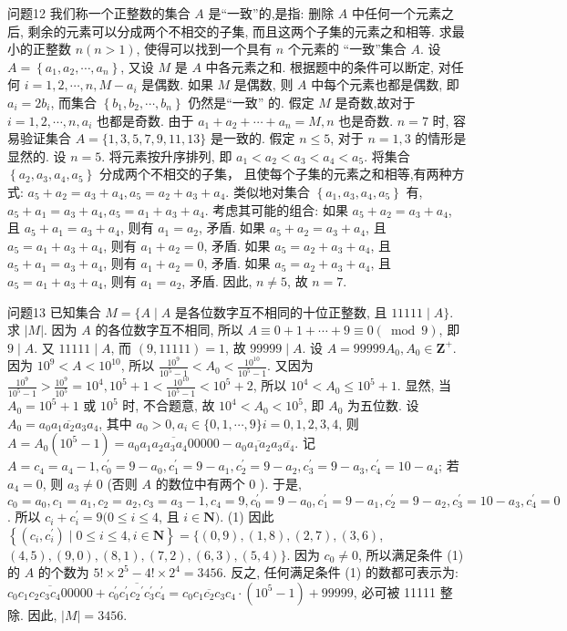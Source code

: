 问题12 我们称一个正整数的集合 $A$ 是“一致”的,是指: 删除 $A$ 中任何一个元素之后, 剩余的元素可以分成两个不相交的子集, 而且这两个子集的元素之和相等.
求最小的正整数 $n(n>1)$, 使得可以找到一个具有 $n$ 个元素的 “一致”集合 $A$.
设 $A=\left\{a_1, a_2, \cdots, a_n\right\}$, 又设 $M$ 是 $A$ 中各元素之和.
根据题中的条件可以断定, 对任何 $i=1,2, \cdots, n, M-a_i$ 是偶数.
如果 $M$ 是偶数, 则 $A$ 中每个元素也都是偶数, 即 $a_i=2 b_i$, 而集合 $\left\{b_1, b_2, \cdots, b_n\right\}$ 仍然是“一致” 的.
假定 $M$ 是奇数,故对于 $i=1,2, \cdots, n, a_i$ 也都是奇数.
由于 $a_1+a_2+\cdots+ a_n=M, n$ 也是奇数.
$n=7$ 时, 容易验证集合 $A=\{1,3,5,7,9,11,13\}$ 是一致的.
假定 $n \leqslant 5$, 对于 $n=1,3$ 的情形是显然的.
设 $n=5$. 将元素按升序排列, 即 $a_1<a_2<a_3<a_4<a_5$. 将集合 $\left\{a_2, a_3, a_4, a_5\right\}$ 分成两个不相交的子集， 且使每个子集的元素之和相等,有两种方式: $a_5+a_2=a_3+a_4, a_5=a_2+a_3+ a_4$. 类似地对集合 $\left\{a_1, a_3, a_4, a_5\right\}$ 有, $a_5+a_1=a_3+a_4, a_5=a_1+a_3+a_4$. 考虑其可能的组合: 如果 $a_5+a_2=a_3+a_4$, 且 $a_5+a_1=a_3+a_4$, 则有 $a_1= a_2$, 矛盾.
如果 $a_5+a_2=a_3+a_4$, 且 $a_5=a_1+a_3+a_4$, 则有 $a_1+a_2=0$, 矛盾.
如果 $a_5=a_2+a_3+a_4$, 且 $a_5+a_1=a_3+a_4$, 则有 $a_1+a_2=0$, 矛盾.
如果 $a_5=a_2+a_3+a_4$, 且 $a_5=a_1+a_3+a_4$, 则有 $a_1=a_2$, 矛盾.
因此, $n \neq 5$, 故 $n=7$.



问题13 已知集合 $M=\{A \mid A$ 是各位数字互不相同的十位正整数, 且 $11111 \mid A\}$. 求 $|M|$.
因为 $A$ 的各位数字互不相同, 所以 $A \equiv 0+1+\cdots+9 \equiv 0(\bmod 9)$, 即 $9 \mid A$. 又 $11111 \mid A$, 而 $(9,11111)=1$, 故 $99999 \mid A$. 设 $A=99999 A_0, A_0 \in \mathbf{Z}^{+}$. 因为 $10^9<A<10^{10}$, 所以 $\frac{10^9}{10^5-1}<A_0<\frac{10^{10}}{10^5-1}$. 又因为 $\frac{10^9}{10^5-1}> \frac{10^9}{10^5}=10^4, 10^5+1<\frac{10^{10}}{10^5-1}<10^5+2$, 所以 $10^4<A_0 \leqslant 10^5+1$.
显然, 当 $A_0=10^5+1$ 或 $10^5$ 时, 不合题意, 故 $10^4<A_0<10^5$, 即 $A_0$ 为五位数.
设 $A_0=\overline{a_0 a_1 a_2 a_3 a_4}$, 其中 $a_0>0, a_i \in\{0,1, \cdots, 9\} i=0,1,2,3,4$, 则 $A=A_0\left(10^5-1\right)=\overline{a_0 a_1 a_2 a_3 a_4 00000}-\overline{a_0 a_1 a_2 a_3} \overline{a_4}$. 记 $A= c_4=a_4-1, c_0^{\prime}=9-a_0, c_1^{\prime}=9-a_1, c_2^{\prime}=9-a_2, c_3^{\prime}=9-a_3, c_4^{\prime}=10- a_4$; 若 $a_4=0$, 则 $a_3 \neq 0$ (否则 $A$ 的数位中有两个 0 ). 于是, $c_0=a_0, c_1=a_1, c_2=a_2, c_3=a_3-1, c_4=9, c_0^{\prime}=9-a_0, c_1^{\prime}=9-a_1, c_2^{\prime}=9-a_2, c_3^{\prime}= 10-a_3, c_4^{\prime}=0$. 所以 $c_i+c_i^{\prime}=9(0 \leqslant i \leqslant 4$, 且 $i \in \mathbf{N})$. (1)
因此 $\left\{\left(c_i, c_i^{\prime}\right) \mid 0 \leqslant i \leqslant 4, i \in \mathbf{N}\right\}=\{(0,9),(1,8),(2,7),(3,6)$, $(4,5),(9,0),(8,1),(7,2),(6,3),(5,4)\}$. 因为 $c_0 \neq 0$, 所以满足条件 (1) 的 $A$ 的个数为 $5 ! \times 2^5-4 ! \times 2^4=3456$. 反之, 任何满足条件 (1) 的数都可表示为: $\overline{c_0 c_1 c_2 c_3 c_4 00000}+\overline{c_0^{\prime} c_1^{\prime} c_2{ }^{\prime} c_3^{\prime} c_4^{\prime}}=\overline{c_0 c_1 c_2 c_3 c_4} \cdot\left(10^5-1\right)+99999$, 必可被 11111 整除.
因此, $|M|=3456$.



